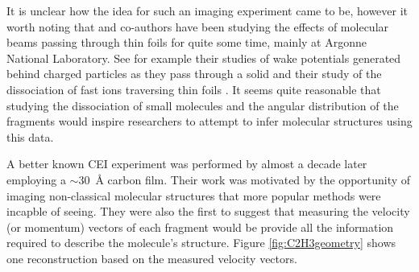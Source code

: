 
It is unclear how the idea for such an imaging experiment came to be, however it worth noting that \citet{Gaillard78} and co-authors have been studying the effects of molecular beams passing through thin foils for quite some time, mainly at Argonne National Laboratory. See for example their studies of wake potentials generated behind charged particles as they pass through a solid \citep{Gemmell75, Vager76PRL} and their study of the dissociation of fast  ions traversing thin foils \citep{Vager76PRA}. It seems quite reasonable that studying the dissociation of small molecules and the angular distribution of the fragments would inspire researchers to attempt to infer molecular structures using this data.

A better known CEI experiment was performed by \citet{Vager89} almost a decade later employing a $\sim$\SI{30}{\angstrom} carbon film. Their work was motivated by the opportunity of imaging non-classical molecular structures that more popular methods were incapble of seeing. They were also the first to suggest that measuring the velocity (or momentum) vectors of each fragment would be provide all the information required to describe the molecule's structure. Figure \ref{fig:C2H3geometry} shows one reconstruction based on the measured velocity vectors.

